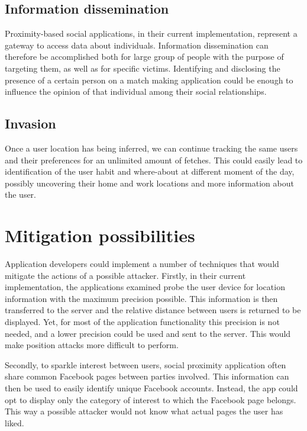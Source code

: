 \subsection{Information dissemination}

Proximity-based social applications, in their current implementation, represent a gateway to access data about individuals. Information dissemination can therefore be accomplished both for large group of people with the purpose of targeting them, as well as for specific victims.
Identifying and disclosing the presence of a certain person on a match making application could be enough to influence the opinion of that individual among their social relationships.

\subsection{Invasion}
Once a user location has being inferred, we can continue tracking the same users and their preferences for an unlimited amount of fetches. This could easily lead to identification of the user habit and where-about at different moment of the day, possibly uncovering their home and work locations and more information about the user.

\section{Mitigation possibilities}

Application developers could implement a number of techniques that would mitigate the actions of a possible attacker. Firstly, in their current implementation, the applications examined probe the user device for location information with the maximum precision possible. This information is then transferred to the server and the relative distance between users is returned to be displayed. Yet, for most of the application functionality this precision is not needed, and a lower precision could be used and sent to the server. This would make position attacks more difficult to perform.

Secondly, to sparkle interest between users, social proximity application often share common Facebook pages between parties involved. This information can then be used to easily identify unique Facebook accounts. Instead, the app could opt to display only the category of interest to which the Facebook page belongs. This way a possible attacker would not know what actual pages the user has liked.

